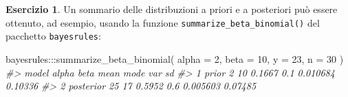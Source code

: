 \documentclass[
  11pt,
]{krantz}
\makeatletter
\newenvironment{Shaded}{\begin{snugshade}}{\end{snugshade}}
\newcommand{\AttributeTok}[1]{\textcolor[rgb]{0.61,0.61,0.61}{#1}}
\newcommand{\CommentTok}[1]{\textcolor[rgb]{0.37,0.37,0.37}{\textit{#1}}}
\newcommand{\DecValTok}[1]{\textcolor[rgb]{0.06,0.06,0.06}{#1}}
\newcommand{\FunctionTok}[1]{\textcolor[rgb]{0,0,0}{#1}}
\newcommand{\NormalTok}[1]{#1}
\newcommand{\SpecialCharTok}[1]{\textcolor[rgb]{0,0,0}{#1}}
\newenvironment{kframe}{%
\medskip{}
\setlength{\fboxsep}{.8em}
 \def\at@end@of@kframe{}%
 \ifinner\ifhmode%
  \def\at@end@of@kframe{\end{minipage}}%
  \begin{minipage}{\columnwidth}%
 \fi\fi%
 \def\FrameCommand##1{\hskip\@totalleftmargin \hskip-\fboxsep
 \colorbox{shadecolor}{##1}\hskip-\fboxsep
     \hskip-\linewidth \hskip-\@totalleftmargin \hskip\columnwidth}%
 \MakeFramed {\advance\hsize-\width
   \@totalleftmargin\z@ \linewidth\hsize
   \@setminipage}}%
 {\par\unskip\endMakeFramed%
 \at@end@of@kframe}
\renewenvironment{Shaded}{\begin{kframe}}{\end{kframe}}
\theoremstyle{definition}
\theoremstyle{definition}
\theoremstyle{definition}
\newtheorem{exercise}{Esercizio}[chapter]
\theoremstyle{definition}
\theoremstyle{remark}
\makeatother
\begin{document}
\begin{exercise}
Un sommario delle distribuzioni a priori e a posteriori può essere ottenuto, ad esempio, usando la funzione \texttt{summarize\_beta\_binomial()} del pacchetto \texttt{bayesrules}:

\begin{Shaded}
\begin{Highlighting}[]
\NormalTok{bayesrules}\SpecialCharTok{:::}\FunctionTok{summarize\_beta\_binomial}\NormalTok{(}
  \AttributeTok{alpha =} \DecValTok{2}\NormalTok{, }\AttributeTok{beta =} \DecValTok{10}\NormalTok{, }\AttributeTok{y =} \DecValTok{23}\NormalTok{, }\AttributeTok{n =} \DecValTok{30}
\NormalTok{)}
\CommentTok{\#\textgreater{}       model alpha beta   mean mode      var      sd}
\CommentTok{\#\textgreater{} 1     prior     2   10 0.1667  0.1 0.010684 0.10336}
\CommentTok{\#\textgreater{} 2 posterior    25   17 0.5952  0.6 0.005603 0.07485}
\end{Highlighting}
\end{Shaded}

\end{exercise}
\end{document}
